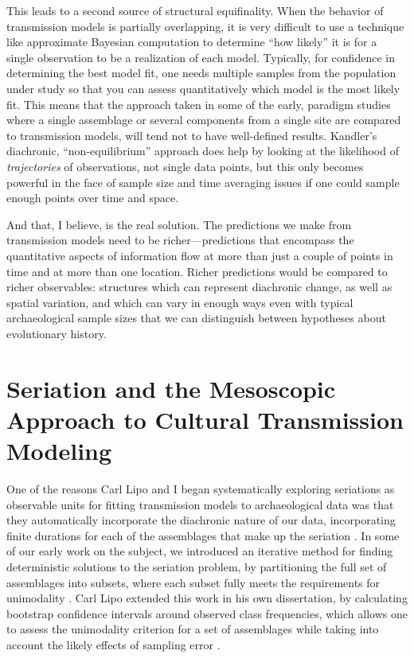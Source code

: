 This leads to a second source of structural equifinality.  When the behavior of transmission models is partially overlapping, it is very difficult to use a technique like approximate Bayesian computation to determine ``how likely'' it is for a single observation to be a realization of each model.  Typically, for confidence in determining the best model fit, one needs multiple samples from the population under study so that you can assess quantitatively which model is the most likely fit.  This means that the approach taken in some of the early, paradigm studies where a single assemblage or several components from a single site are compared to transmission models, will tend not to have well-defined results.  Kandler's \citeyear{Kandler2013} diachronic, ``non-equilibrium'' approach does help by looking at the likelihood of \emph{trajectories} of observations, not single data points, but this only becomes powerful in the face of sample size and time averaging issues if one could sample enough points over time and space.  

And that, I believe, is the real solution.  The predictions we make from transmission models need to be richer---predictions that encompass the quantitative aspects of information flow at more than just a couple of points in time and at more than one location.  Richer predictions would be compared to richer observables:  structures which can represent diachronic change, as well as spatial variation, and which can vary in enough ways even with typical archaeological sample sizes that we can distinguish between hypotheses about evolutionary history.  

\section{Seriation and the Mesoscopic Approach to Cultural Transmission Modeling}

One of the reasons Carl Lipo and I \citep{huntmadsenlipo1995a,lipomadsenhunt1995b,Lipo1997,Lipo2000,lipomadsen1997,Lipo2001a,Lipo2001} began systematically exploring seriations as observable units for fitting transmission models to archaeological data was that they automatically incorporate the diachronic nature of our data, incorporating finite durations for each of the assemblages that make up the seriation \citep{dunnell1970seriation}.  In some of our early work on the subject, we introduced an iterative method for finding deterministic solutions to the seriation problem, by partitioning the full set of assemblages into subsets, where each subset fully meets the requirements for unimodality \citep{Lipo1997}.  Carl Lipo extended this work in his own dissertation, by calculating bootstrap confidence intervals around observed class frequencies, which allows one to assess the unimodality criterion for a set of assemblages while taking into account the likely effects of sampling error \citep{Lipo2001}.  


